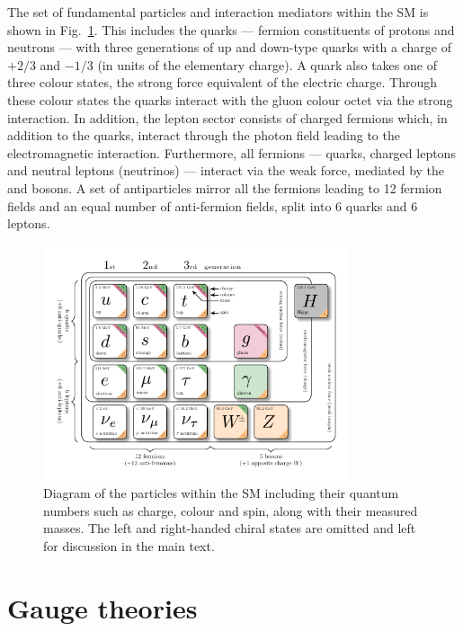 The set of fundamental particles and interaction mediators within the SM is shown in Fig.~\ref{fig:particle}. This includes the quarks --- fermion constituents of protons and neutrons --- with three generations of up and down-type quarks with a charge of $+2/3$ and $-1/3$ (in units of the elementary charge). A quark also takes one of three colour states, the strong force equivalent of the electric charge. Through these colour states the quarks interact with the gluon colour octet via the strong interaction. In addition, the lepton sector consists of charged fermions which, in addition to the quarks, interact through the photon field leading to the electromagnetic interaction. Furthermore, all fermions --- quarks, charged leptons and neutral leptons (neutrinos) --- interact via the weak force, mediated by the \PW and \PZ bosons. A set of antiparticles mirror all the fermions leading to 12 fermion fields and an equal number of anti-fermion fields, split into 6 quarks and 6 leptons.

\begin{figure}[htb]
    \centering
    \includegraphics[width=0.8\textwidth]{diagrams/tikz/standard_model/standard_model.pdf}
    \caption[Summary of the standard model particles.]{
        Diagram of the particles within the SM including their quantum numbers such as charge, colour and spin, along with their measured masses. The left and right-handed chiral states are omitted and left for discussion in the main text.
    }
    \label{fig:particle}
\end{figure}


\section{Gauge theories}

